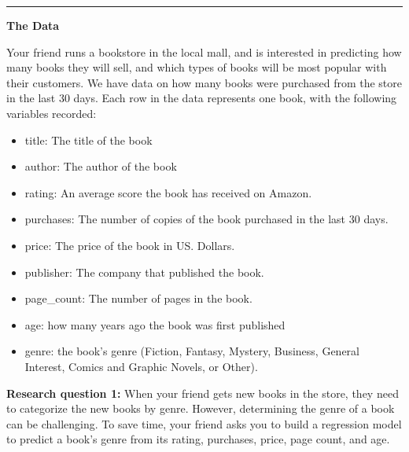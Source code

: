 \documentclass[11pt]{article}
\begin{document}
\begin{titlepage}



\end{titlepage}

\pagebreak

$\:$ \\
\thispagestyle{empty}
\pagebreak

\setcounter{page}{1}

\rule{\textwidth}{0.5pt}

\textbf{The Data} 

Your friend runs a bookstore in the local mall, and is interested in predicting how many books they will sell, and which types of books will be most popular with their customers. We have data on how many books were purchased from the store in the last 30 days. Each row in the data represents one book, with the following variables recorded:

\begin{itemize}
\item title: The title of the book
\item author: The author of the book
\item rating: An average score the book has received on Amazon.
\item purchases: The number of copies of the book purchased in the last 30 days.
\item price: The price of the book in US. Dollars.
\item publisher: The company that published the book.
\item page\_count: The number of pages in the book.
\item age: how many years ago the book was first published
\item genre: the book's genre (Fiction, Fantasy, Mystery, Business, General Interest, Comics and Graphic Novels, or Other).
\end{itemize}

\textbf{Research question 1:} When your friend gets new books in the store, they need to categorize the new books by genre. However, determining the genre of a book can be challenging. To save time, your friend asks you to build a regression model to predict a book's genre from its rating, purchases, price, page count, and age.
\end{document}
